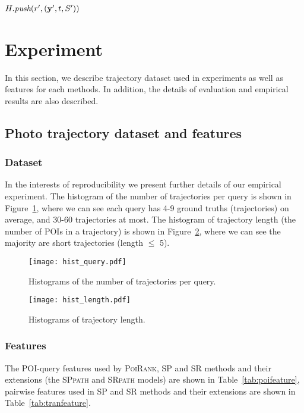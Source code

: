 \begin{algorithm}[htbp]
\begin{algorithmic}[1]
        \STATE \vspace{3pt}$H.\textit{push}(r', (\mathbf{y}', t, S') )$ \vspace{2pt}
    \ENDFOR
\ENDWHILE
\end{algorithmic}
\end{algorithm}

\clearpage

\section{Experiment}

In this section, we describe trajectory dataset used in experiments as well as features for each methods.
In addition, the details of evaluation and empirical results are also described.

\subsection{Photo trajectory dataset and features}
\label{sec:feature}

\subsubsection{Dataset}
In the interests of reproducibility we present further details of our empirical experiment.
The histogram of the number of trajectories per query is shown in Figure~\ref{fig:hist_query},
where we can see each query has 4-9 ground truths (\ie trajectories) on average, and 30-60 trajectories at most.
The histogram of trajectory length (\ie the number of POIs in a trajectory) is shown in Figure~\ref{fig:hist_length},
where we can see the majority are short trajectories (\ie length $\le$ 5).

\begin{figure}[t]
	\centering
	\texttt{[image: hist\_query.pdf]}
	\caption{Histograms of the number of trajectories per query.}
	\label{fig:hist_query}
\end{figure}


\begin{figure}[t]
	\centering
	\texttt{[image: hist\_length.pdf]}
	\caption{Histograms of trajectory length.}
	\label{fig:hist_length}
\end{figure}


\subsubsection{Features}
The POI-query features used by \textsc{PoiRank}, SP and SR methods and their extensions 
(\ie the \textsc{SPpath} and \textsc{SRpath} models) are shown in Table~\ref{tab:poifeature},
pairwise features used in SP and SR methods and their extensions are shown in Table~\ref{tab:tranfeature}.

